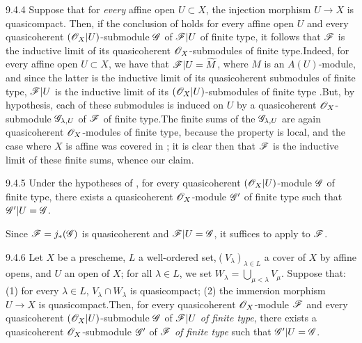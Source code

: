 \documentclass{book}
\begin{document}
\begin{env}[Remark]{9.4.4}
\label{rmk-1.9.4.4}
Suppose that for \emph{every} affine open $U\subset X$,
the injection morphism $U\to X$ is quasicompact. Then, if the conclusion
of  holds for every affine open $U$ and every quasicoherent
$(\mathscr{O}_X|U)$-submodule $\mathscr{G}$ of $\mathscr{F}|U$ of finite type, it
follows that $\mathscr{F}$ is the inductive limit of its
quasicoherent $\mathscr{O}_X$-submodules of finite type.Indeed, for every affine open
$U\subset X$, we have that $\mathscr{F}|U=\widetilde{M}$, where $M$ is an
$A(U)$-module, and since the latter is the inductive limit of its quasicoherent
submodules of finite type, $\mathscr{F}|U$ is the inductive limit of its
$(\mathscr{O}_X|U)$-submodules of finite type .But, by hypothesis, each of
these submodules is induced on $U$ by a quasicoherent $\mathscr{O}_X$-submodule
$\mathscr{G}_{\lambda,U}$ of $\mathscr{F}$ of finite type.The finite sums of the
$\mathscr{G}_{\lambda,U}$ are again quasicoherent $\mathscr{O}_X$-modules of finite type,
because the property is local, and the case where $X$ is affine was covered in
; it is clear then that $\mathscr{F}$ is the inductive limit of these
finite sums, whence our claim.
\end{env}
 
\begin{envs}[Corollary]{9.4.5}
\label{cor-1.9.4.5}
Under the hypotheses of , for every quasicoherent $(\mathscr{O}_X|U)$-module
$\mathscr{G}$ of finite type, there exists a quasicoherent $\mathscr{O}_X$-module
$\mathscr{G}'$ of finite type such that $\mathscr{G}'|U=\mathscr{G}$.
\end{envs}

Since $\mathscr{F}=j_\ast(\mathscr{G})$ is quasicoherent  and
$\mathscr{F}|U=\mathscr{G}$, it suffices to apply  to $\mathscr{F}$.

\begin{envs}[Lemma]{9.4.6}
\label{lem-1.9.4.6}
Let $X$ be a prescheme, $L$ a well-ordered set,$(V_\lambda)_{\lambda\in L}$ a cover
of $X$ by affine opens, and $U$ an open of
$X$; for all $\lambda\in L$, we set $W_\lambda=\bigcup_{\mu<\lambda}V_\mu$.
Suppose that: (1) for every $\lambda\in L$, $V_\lambda\cap W_\lambda$ is
quasicompact; (2) the immersion morphism $U\to X$ is quasicompact.Then, for
every quasicoherent $\mathscr{O}_X$-module $\mathscr{F}$ and every quasicoherent
$(\mathscr{O}_X|U)$-submodule $\mathscr{G}$ of $\mathscr{F}|U$ \emph{of finite type}, there
exists a quasicoherent $\mathscr{O}_X$-submodule $\mathscr{G}'$ of $\mathscr{F}$ \emph{of
finite type} such that $\mathscr{G}'|U=\mathscr{G}$.
\end{envs}
\end{document}
